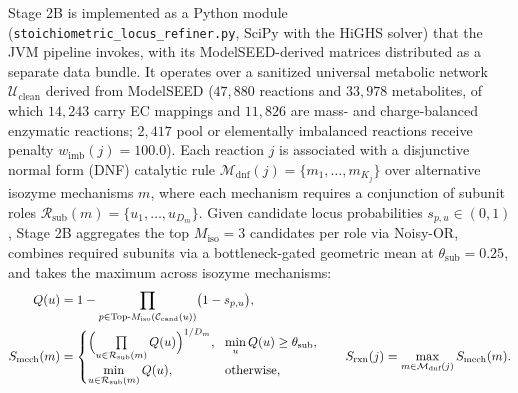 \documentclass[10pt,twocolumn]{article}
\begin{document}
Stage 2B is implemented as a Python module (\texttt{stoichiometric\_locus\_refiner.py}, SciPy with the HiGHS solver) that the JVM pipeline invokes, with its ModelSEED-derived matrices distributed as a separate data bundle. It operates over a sanitized universal metabolic network $\mathcal{U}_{\text{clean}}$ derived from ModelSEED \citep{seaver2021modelseed} ($47{,}880$ reactions and $33{,}978$ metabolites, of which $14{,}243$ carry EC mappings and $11{,}826$ are mass- and charge-balanced enzymatic reactions; $2{,}417$ pool or elementally imbalanced reactions receive penalty $w_{\text{imb}}(j) = 100.0$). Each reaction $j$ is associated with a disjunctive normal form (DNF) catalytic rule $\mathcal{M}_{\text{dnf}}(j) = \{m_1, \dots, m_{K_j}\}$ over alternative isozyme mechanisms $m$, where each mechanism requires a conjunction of subunit roles $\mathcal{R}_{\text{sub}}(m) = \{u_1, \dots, u_{D_m}\}$. Given candidate locus probabilities $s_{p, u} \in (0, 1)$, Stage 2B aggregates the top $M_{\text{iso}} = 3$ candidates per role via Noisy-OR, combines required subunits via a bottleneck-gated geometric mean at $\theta_{\text{sub}} = 0.25$, and takes the maximum across isozyme mechanisms:
\begin{equation}
  \begin{aligned}
    Q(u) &= 1 - \prod\limits_{p \in \text{Top-}M_{\text{iso}}(\mathcal{C}_{\text{cand}}(u))} \bigl(1 - s_{p, u}\bigr), \\
    S_{\text{mech}}(m) &= \begin{cases}
      \Bigl(\prod\limits_{u \in \mathcal{R}_{\text{sub}}(m)} Q(u)\Bigr)^{1 / D_m}, & \!\min\limits_{u} Q(u) \ge \theta_{\text{sub}}, \\
      \min\limits_{u \in \mathcal{R}_{\text{sub}}(m)} Q(u), & \!\text{otherwise,}
    \end{cases} \qquad S_{\text{rxn}}(j) = \max_{m \in \mathcal{M}_{\text{dnf}}(j)} S_{\text{mech}}(m).
  \end{aligned}
  \label{eq:gpr_agg}
\end{equation}
\end{document}
